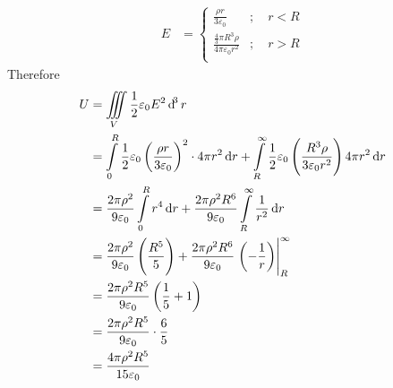 \documentclass[fleqn, a4paper, 8pt, twoside]{amsart}
\theoremstyle{definition}
\theoremstyle{theorem}
\begin{document}
\begin{multicols}{2}
\begin{spacing}{0.6}
\begin{solution}
	\begin{align*}
		E &= 
			\begin{cases}
				\frac{\rho r}{3 \varepsilon_0}                            & ;\quad r < R \\
				\frac{\frac{4}{3} \pi R^3 \rho}{4 \pi \varepsilon_0 r^2} & ;\quad r > R \\
			\end{cases}
	\end{align*}
	Therefore
	\begin{align*}
		U & = \iiint\limits_{V} \frac{1}{2} \varepsilon_0 E^2 \dif^3 r                                                                                                                                                                                          \\
                  & = \int\limits_{0}^{R} \frac{1}{2} \varepsilon_0 \left( \frac{\rho r}{3 \varepsilon_0} \right)^2 \cdot 4 \pi r^2 \dif r + \int\limits_{R}^{\infty} \frac{1}{2} \varepsilon_0 \left( \frac{R^3 \rho}{3 \varepsilon_0 r^2} \right) 4 \pi r^2 \dif r \\
                  & = \frac{2 \pi \rho^2}{9 \varepsilon_0} \int\limits_{0}^{R} r^4 \dif r + \frac{2 \pi \rho^2 R^6}{9 \varepsilon_0} \int\limits_{R}^{\infty} \frac{1}{r^2} \dif r                                                                                    \\
                  & = \frac{2 \pi \rho^2}{9 \varepsilon_0} \left( \frac{R^5}{5} \right) + \frac{2 \pi \rho^2 R^6}{9 \varepsilon_0} \left. \left( -\frac{1}{r} \right) \right|_{R}^{\infty}                                                                           \\
                  & = \frac{2 \pi \rho^2 R^5}{9 \varepsilon_0} \left( \frac{1}{5} + 1 \right)                                                                                                                                                                          \\
                  & = \frac{2 \pi \rho^2 R^5}{9 \varepsilon_0} \cdot \frac{6}{5}                                                                                                                                                                                       \\
                  & = \frac{4 \pi \rho^2 R^5}{15 \varepsilon_0}
	\end{align*}
\end{solution}


\end{spacing}
\end{multicols}
\end{document}
